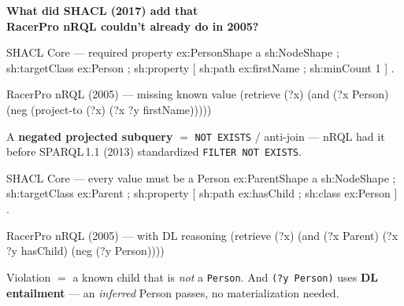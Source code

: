 \documentclass[11pt]{article}
\begin{document}
\centering

{\fontsize{26}{31}\selectfont\bfseries\color{ink}
What did \textcolor{shaclblue}{SHACL} (2017) add that\\[3pt]
RacerPro \textcolor{nrqlgreen}{nRQL} couldn't already do in 2005?\par}

\vspace{12pt}

\begin{center}\begin{minipage}{0.82\textwidth}\begin{tcbraster}[raster columns=2, raster column skip=6mm, raster equal height=rows]
\begin{shaclbox}{SHACL Core --- required property}
ex:PersonShape
  a sh:NodeShape ;
  sh:targetClass ex:Person ;
  sh:property [
    sh:path ex:firstName ;
    sh:minCount 1 ] .
\end{shaclbox}
\begin{nrqlbox}{RacerPro nRQL (2005) --- missing known value}
(retrieve (?x)
  (and
    (?x Person)
    (neg
      (project-to (?x)
        (?x ?y firstName)))))
\end{nrqlbox}
\end{tcbraster}\end{minipage}\end{center}
{\Large\color{muted} A \textbf{negated projected subquery} $=$ \texttt{NOT EXISTS} / anti-join --- nRQL had it before SPARQL\,1.1 (2013) standardized \texttt{FILTER NOT EXISTS}.\par}

\vspace{11pt}

\begin{center}\begin{minipage}{0.82\textwidth}\begin{tcbraster}[raster columns=2, raster column skip=6mm, raster equal height=rows]
\begin{shaclbox}{SHACL Core --- every value must be a Person}
ex:ParentShape
  a sh:NodeShape ;
  sh:targetClass ex:Parent ;
  sh:property [
    sh:path ex:hasChild ;
    sh:class ex:Person ] .
\end{shaclbox}
\begin{nrqlbox}{RacerPro nRQL (2005) --- with DL reasoning}
(retrieve (?x)
  (and
    (?x Parent)
    (?x ?y hasChild)
    (neg
      (?y Person))))
\end{nrqlbox}
\end{tcbraster}\end{minipage}\end{center}
{\Large\color{muted} Violation $=$ a known child that is \emph{not} a \texttt{Person}. And \texttt{(?y Person)} uses \textbf{DL entailment} --- an \emph{inferred} Person passes, no materialization needed.\par}
\end{document}
